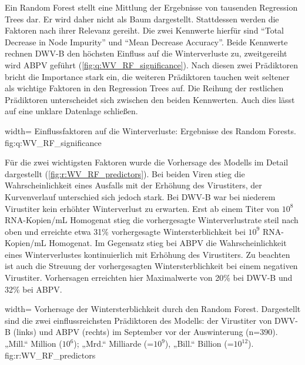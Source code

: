  Ein Random Forest stellt eine Mittlung der Ergebnisse von tausenden Regression Trees dar. Er wird daher nicht als Baum dargestellt. Stattdessen werden die Faktoren nach ihrer Relevanz gereiht. Die zwei Kennwerte hierfür sind \enquote{Total Decrease in Node Impurity} und \enquote{Mean Decrease Accuracy}. Beide Kennwerte rechnen DWV-B den höchsten Einfluss auf die Winterverluste zu, zweitgereiht wird ABPV geführt (\cref{fig:q:WV_RF_significance}). Nach diesen zwei Prädiktoren bricht die Importance stark ein, die weiteren Prädiktoren tauchen weit seltener als wichtige Faktoren in den Regression Trees auf. Die Reihung der restlichen Prädiktoren unterscheidet sich  zwischen den beiden Kennwerten. Auch dies lässt auf eine unklare Datenlage schließen.

 
  {width=\textwidth} %
  {Einflussfaktoren auf die Winterverluste: Ergebnisse des Random Forests.} %
  {} %
  {fig:q:WV_RF_significance} %
  
  Für die zwei wichtigsten Faktoren wurde die Vorhersage des Modells im Detail dargestellt (\cref{fig:r:WV_RF_predictors}). Bei beiden Viren stieg die Wahrscheinlichkeit eines Ausfalls mit der Erhöhung des Virustiters, der Kurvenverlauf unterschied sich jedoch stark. Bei DWV-B war bei niederem Virustiter kein erhöhter Winterverlust zu erwarten. Erst ab einem Titer von $10^8$ RNA-Kopien/\si{\milli\liter} Homogenat stieg die vorhergesagte Winterverlustrate steil nach oben und erreichte etwa 31\% vorhergesagte Wintersterblichkeit bei $10^9$ RNA-Kopien/\si{\milli\liter} Homogenat. Im Gegensatz stieg bei ABPV die Wahrscheinlichkeit eines Winterverlustes kontinuierlich mit Erhöhung des Virustiters. Zu beachten ist auch die Streuung der vorhergesagten Wintersterblichkeit bei einem negativen Virustiter. Vorhersagen erreichten hier Maximalwerte von 20\% bei DWV-B und 32\% bei ABPV.
  
  
  {width=\textwidth} %
  {Vorhersage der Wintersterblichkeit durch den Random Forest. Dargestellt sind die zwei einflussreichsten Prädiktoren des Modells: der Virustiter von DWV-B (links) und ABPV (rechts) im September vor der Auswinterung (n=390).„Mill.“ Million ($10^6$); „Mrd.“ Milliarde (=$10^9$), „Bill.“ Billion (=$10^{12}$).} %
  {} %
  {fig:r:WV_RF_predictors} %
  
